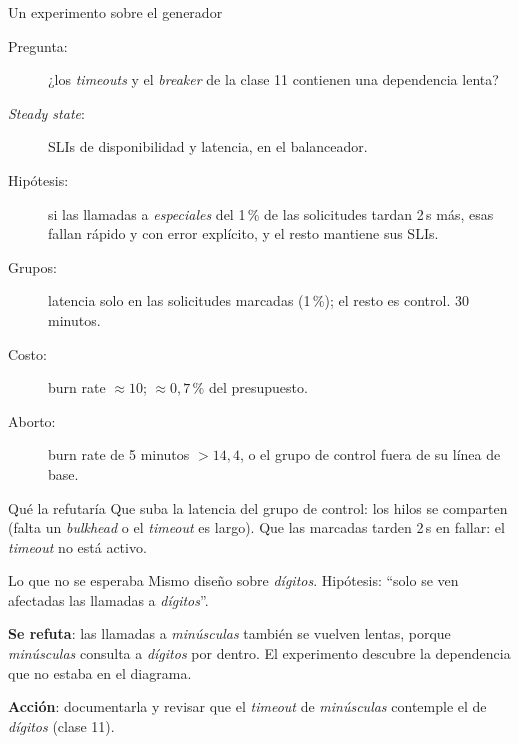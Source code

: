 \documentclass[institutional,screen,none]{ua-engineering-v6-beamer}
\begin{document}
\begin{frame}{Un experimento sobre el generador}
\small
\begin{description}
\item[Pregunta:] ¿los \emph{timeouts} y el \emph{breaker} de la clase 11 contienen una dependencia lenta?
\item[\emph{Steady state}:] SLIs de disponibilidad y latencia, en el balanceador.
\item[Hipótesis:] si las llamadas a \emph{especiales} del 1\,\% de las solicitudes tardan 2\,s más, esas fallan rápido y con error explícito, y el resto mantiene sus SLIs.
\item[Grupos:] latencia solo en las solicitudes marcadas (1\,\%); el resto es control. 30 minutos.
\item[Costo:] burn rate $\approx 10$; $\approx 0{,}7\,\%$ del presupuesto.
\item[Aborto:] burn rate de 5 minutos $> 14{,}4$, o el grupo de control fuera de su línea de base.
\end{description}

\pause

\begin{alertblock}{Qué la refutaría}
Que suba la latencia del grupo de control: los hilos se comparten (falta un \emph{bulkhead} o el \emph{timeout} es largo). Que las marcadas tarden 2\,s en fallar: el \emph{timeout} no está activo.
\end{alertblock}
\end{frame}

\begin{frame}{Lo que no se esperaba}
Mismo diseño sobre \emph{dígitos}. Hipótesis: ``solo se ven afectadas las llamadas a \emph{dígitos}''.

\pause


\pause

{\small \textbf{Se refuta}: las llamadas a \emph{minúsculas} también se vuelven lentas, porque \emph{minúsculas} consulta a \emph{dígitos} por dentro. El experimento descubre la dependencia que no estaba en el diagrama.}

{\small \textbf{Acción}: documentarla y revisar que el \emph{timeout} de \emph{minúsculas} contemple el de \emph{dígitos} (clase 11).}
\end{frame}
\end{document}
